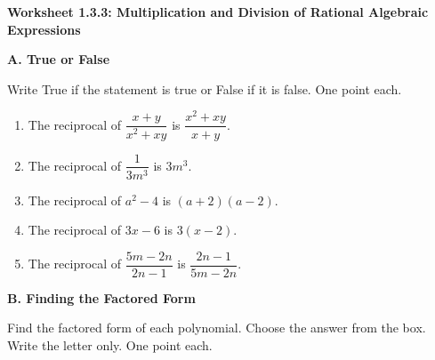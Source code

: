 

\def \Lesson {Multiplication and Division of Rational Algebraic Expressions}
\def \LessonCode {1.3.3}


	\begin{center}
		\textbf{\large Worksheet \LessonCode: \Lesson}
	\end{center}

    \vspace*{2em}

    \noindent \textbf{A. True or False} 
    
    Write True if the statement is true or False if it is false. One point each.
    
    \begin{enumerate}
    	\item The reciprocal of $ \dfrac{x + y}{x^2 + xy} $ is $ \dfrac{x^2 + xy}{x + y} $.
    	\item The reciprocal of $ \dfrac{1}{3m^3} $ is $ 3m^3 $.
    	\item The reciprocal of $ a^2 - 4 $ is $ (a + 2)(a - 2) $.
    	\item The reciprocal of $ 3x - 6 $ is $ 3(x - 2) $.
    	\item The reciprocal of $ \dfrac{5m - 2n}{2n - 1} $ is $ \dfrac{2n - 1}{5m - 2n} $.
    \end{enumerate}

    \vspace*{1.3ex}

    \noindent \textbf{B. Finding the Factored Form} 
    
    Find the factored form of each polynomial. Choose the answer from the box. Write the letter only. One point each.
    
    \begin{center}  
    \end{center}
        
